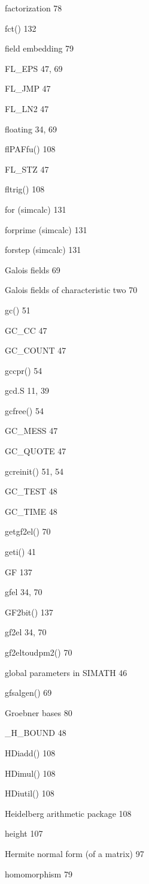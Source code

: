 \begin{theindex}
\indexspace

\item factorization 78
\item fct() 132
\item field embedding 79
\item FL\_EPS 47, 69
\item FL\_JMP 47
\item FL\_LN2 47
\item floating 34, 69
\item flPAFfu() 108
\item FL\_STZ 47
\item fltrig() 108
\item for (simcalc) 131
\item forprime (simcalc) 131
\item forstep (simcalc) 131

\indexspace
  
\item Galois fields 69
\item Galois fields of characteristic two 70
\item gc() 51
\item GC\_CC 47
\item GC\_COUNT 47
\item gccpr() 54
\item gcd.S 11, 39
\item gcfree() 54
\item GC\_MESS 47
\item GC\_QUOTE 47
\item gcreinit() 51, 54
\item GC\_TEST 48
\item GC\_TIME 48
\item getgf2el() 70
\item geti() 41
\item GF 137
\item gfel 34, 70
\item GF2bit() 137
\item gf2el 34, 70
\item gf2eltoudpm2() 70
\item global parameters in SIMATH 46
\item gfsalgen() 69
\item Groebner bases 80

\indexspace

\item \_H\_BOUND 48
\item HDiadd() 108
\item HDimul() 108
\item HDiutil() 108
\item Heidelberg arithmetic package 108
\item height 107
\item Hermite normal form (of a matrix) 97
\item homomorphism 79


\end{theindex}

